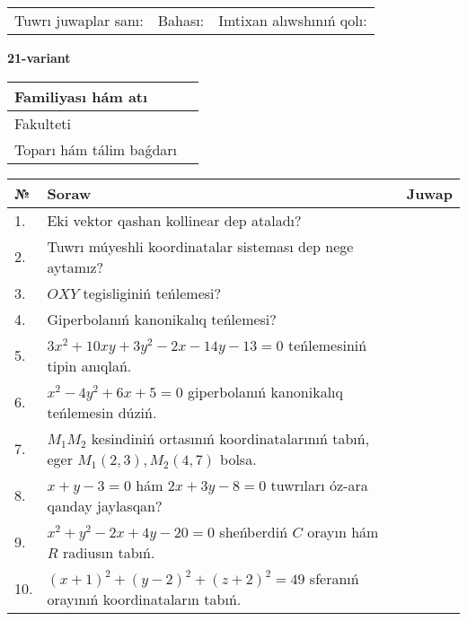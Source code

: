 \documentclass{article}
\begin{document}
\vspace{1cm}

\begin{tabular}{lll}
Tuwrı juwaplar sanı: \underline{\hspace{1.5cm}} & 
Bahası: \underline{\hspace{1.5cm}} & 
Imtixan alıwshınıń qolı: \underline{\hspace{2cm}} \\
\end{tabular}

\egroup

\newpage


\textbf{21-variant}\\

\bgroup
\def\arraystretch{1.6} %

\begin{tabular}{|m{5.7cm}|m{9.5cm}|}
\hline
Familiyası hám atı & \\
\hline
Fakulteti  & \\
\hline
Toparı hám tálim baǵdarı  & \\
\hline
\end{tabular}

\vspace{1cm}

\begin{tabular}{|m{0.7cm}|m{10cm}|m{4cm}|}
\hline
№ & Soraw & Juwap \\
\hline
1. & Eki vektor qashan kollinear dep ataladı? &  \\
\hline
2. & Tuwrı múyeshli koordinatalar sisteması dep nege aytamız? &  \\
\hline
3. & $OXY$ tegisliginiń teńlemesi? &  \\
\hline
4. & Giperbolanıń kanonikalıq teńlemesi? &  \\
\hline
5. & $3x^{2}+10xy+3y^{2}-2x-14y-13=0$ teńlemesiniń tipin anıqlań. &  \\
\hline
6. & $x^{2}-4y^{2}+6x+5=0$ giperbolanıń kanonikalıq teńlemesin dúziń. &  \\
\hline
7. & $M_{1}M_{2}$ kesindiniń ortasınıń koordinatalarınıń tabıń, eger $M_{1} (2, 3), M_{2} (4, 7)$ bolsa. &  \\
\hline
8. & $x+y-3=0$ hám $2x+3y-8=0$ tuwrıları óz-ara qanday jaylasqan? &  \\
\hline
9. & $x^{2}+y^{2}-2x+4y-20=0$ sheńberdiń $C$ orayın hám $R$ radiusın tabıń. &  \\
\hline
10. & $(x+1)^{2}+(y-2) ^{2}+(z+2) ^{2}=49$ sferanıń orayınıń koordinataların tabıń. &  \\
\hline
\end{tabular}
\end{document}
